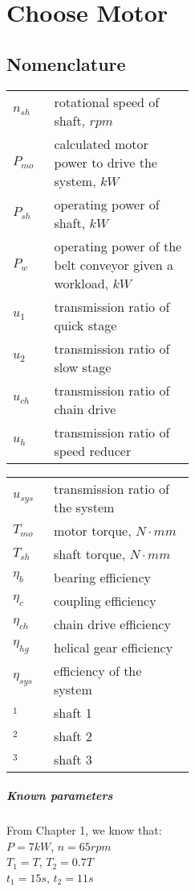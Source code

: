 \chapter{Choose Motor}

\section{Nomenclature}
\begin{tabular}[t]{p{0.05\linewidth}p{0.4\linewidth}}
	$ n_{sh} $ & rotational speed of shaft, $ \unit{rpm} $\\
	$ P_{mo} $ & calculated motor power to drive the system, $ \unit{kW} $\\
	$ P_{sh} $ & operating power of shaft, $ \unit{kW} $\\
	$ P_w $ & operating power of the belt conveyor given a workload, $ \unit{kW} $\\
	$ u_1 $ & transmission ratio of quick stage\\
	$ u_2 $ & transmission ratio of slow stage\\
	$ u_{ch} $ & transmission ratio of chain drive\\
	$ u_{h} $ & transmission ratio of speed reducer
\end{tabular}
\begin{tabular}[t]{p{0.05\linewidth}p{0.4\linewidth}}
	$ u_{sys} $ & transmission ratio of the system\\
	$ T_{mo} $ & motor torque, $ \unit{N\cdot mm} $\\
	$ T_{sh} $ & shaft torque, $ \unit{N\cdot mm} $\\
	$ \eta_b $ & bearing efficiency\\
	$ \eta_c $ & coupling efficiency\\
	$ \eta_{ch} $ & chain drive efficiency\\
	$ \eta_{hg} $ & helical gear efficiency\\
	$ \eta_{sys} $ & efficiency of the system\\
	$ _1 $ & shaft 1\\
	$ _2 $ & shaft 2\\
	$ _3 $ & shaft 3
\end{tabular}
\paragraph{Known parameters} From Chapter 1, we know that:\\
$ P=7\unit{kW}$, $n=65\unit{rpm} $\\
$ T_1=T$, $T_2=0.7T$\\
$ t_1=15\unit{s}$, $t_2=11\unit{s} $

